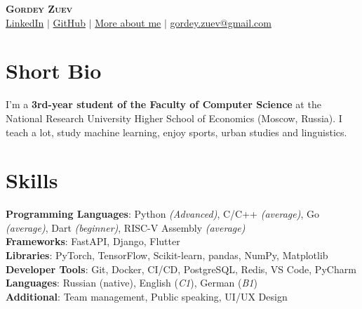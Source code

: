 \documentclass[letterpaper,11pt]{article}
\begin{document}
\begin{center}
    \textsc{\Huge{\textbf{Gordey Zuev}}} \\ \vspace{1pt}
    \href{{https://www.linkedin.com/in/gordey-zuev/}}{\textcolor{blue!50!black}{LinkedIn}} $|$
    \href{https://github.com/GordeyZuev}{\textcolor{blue!50!black}{GitHub}} $|$
    \href{http://gordeyzuev.notion.site}{\textcolor{blue!50!black}{More about me}} $|$
    \href{mailto:gordey.zuev@gmail.com}{\textcolor{blue!50!black}{gordey.zuev@gmail.com}}
\end{center}


\section{Short Bio}
 \begin{itemize}[leftmargin=0.15in, label={}]
    \small{\item{
     {I'm a \textbf{3rd-year student of the Faculty of Computer Science} at the National Research University Higher School of Economics (Moscow, Russia). I teach a lot, study machine learning, enjoy sports, urban studies and linguistics.}
    }}
 \end{itemize}


\section{Skills}
 \begin{itemize}[leftmargin=0.15in, label={}]
    \small{\item{
     \textbf{Programming Languages}{: Python \textit{(Advanced)}, C/C++ \textit{(average)}, Go \textit{(average)}, Dart \textit{(beginner)}, RISC-V Assembly \textit{(average)}} \\
     \textbf{Frameworks}{: FastAPI, Django, Flutter} \\
     \textbf{Libraries}{: PyTorch, TensorFlow, Scikit-learn, pandas, NumPy, Matplotlib} \\
     \textbf{Developer Tools}{: Git, Docker, CI/CD, PostgreSQL, Redis, VS Code, PyCharm} \\
     \textbf{Languages}{: Russian (native), English (\textit{C1}), German (\textit{B1})} \\
     \textbf{Additional}{: Team management, Public speaking, UI/UX Design} \\
    }}
 \end{itemize}
\end{document}
